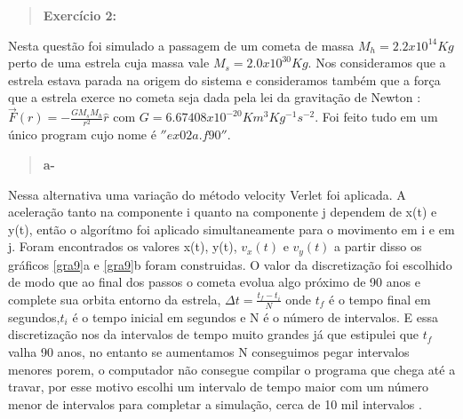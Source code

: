 \documentclass[a4wide]{report}
\begin{document}
\newpage

\begin{quote}

\bf  Exercício 2:

\end{quote}

Nesta questão foi simulado a passagem de um cometa de massa $M_{h} = 2.2 x 10^{14} Kg$ perto de uma estrela cuja massa vale 
$M_{s} = 2.0 x 10^{30} Kg$. Nos consideramos que a estrela estava parada na origem do sistema e consideramos 
também que a força que a estrela exerce no cometa seja dada pela lei da gravitação de Newton : $\Vec{F}(r) = -\frac{GM_{s}M_{h} }{r^{2}}\hat{r}$
com $G = 6.67408 x 10^{-20} Km^{3}Kg^{-1}s^{-2}$. Foi feito tudo em um único program cujo nome é $''ex02a.f90''$.

\begin{quote}

\bf  a-

\end{quote}

Nessa alternativa uma variação do método velocity Verlet foi aplicada. A aceleração tanto na componente i quanto na componente
j dependem de x(t) e y(t), então o algorítmo foi aplicado simultaneamente para o movimento em i e em j. Foram encontrados os 
valores x(t), y(t), $v_{x}(t)$ e $v_{y}(t)$ a partir disso os gráficos \ref{gra9}a  e \ref{gra9}b foram construidas. O valor da 
discretização foi escolhido de modo que ao final dos passos o cometa evolua algo próximo de 90 anos e complete sua orbita entorno da estrela, 
$\Delta t = \frac{t_{f} - t_{i}}{N}$ onde $t_{f}$ é o tempo final em segundos,$t_{i}$ é o tempo inicial em segundos e N é o número 
de intervalos. E essa discretização nos da intervalos de tempo muito grandes já que estipulei que $t_{f}$ valha 90 anos, no entanto
se aumentamos N conseguimos pegar intervalos menores porem, o computador não consegue compilar o programa que chega até a travar, por esse motivo 
escolhi um intervalo de tempo maior com um número menor de intervalos para completar a simulação, cerca de 10 mil intervalos .
\end{document}

